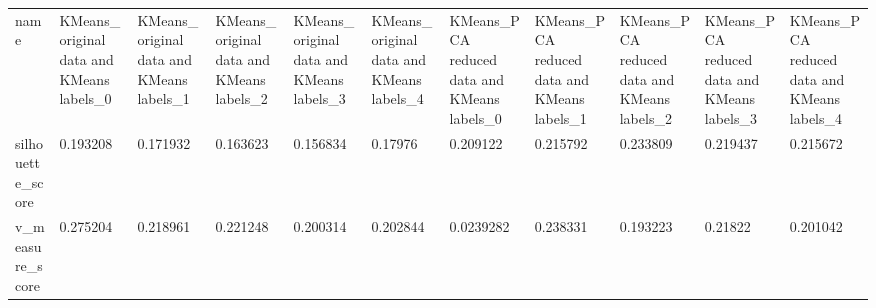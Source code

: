 \begin{tabular}{lllllllllll}
name                  &           KMeans\_original data and KMeans labels\_0 &           KMeans\_original data and KMeans labels\_1 &           KMeans\_original data and KMeans labels\_2 &           KMeans\_original data and KMeans labels\_3 &           KMeans\_original data and KMeans labels\_4 &        KMeans\_PCA reduced data and KMeans labels\_0 &        KMeans\_PCA reduced data and KMeans labels\_1 &        KMeans\_PCA reduced data and KMeans labels\_2 &        KMeans\_PCA reduced data and KMeans labels\_3 &        KMeans\_PCA reduced data and KMeans labels\_4 \\
silhouette\_score      &                                           0.193208 &                                           0.171932 &                                           0.163623 &                                           0.156834 &                                            0.17976 &                                           0.209122 &                                           0.215792 &                                           0.233809 &                                           0.219437 &                                           0.215672 \\
v\_measure\_score       &                                           0.275204 &                                           0.218961 &                                           0.221248 &                                           0.200314 &                                           0.202844 &                                          0.0239282 &                                           0.238331 &                                           0.193223 &                                            0.21822 &                                           0.201042 \\
\bottomrule
\end{tabular}
